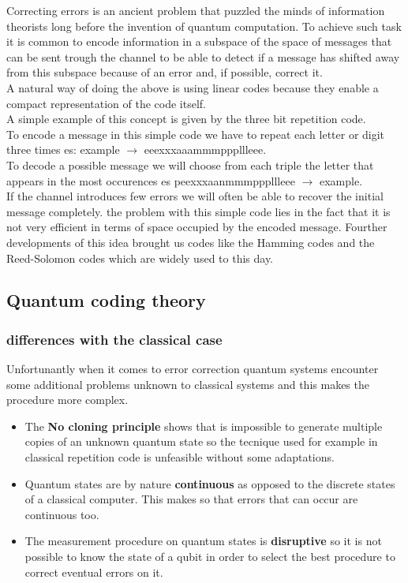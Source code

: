 \documentclass{article}
\begin{document}
Correcting errors is an ancient problem that puzzled the minds of
information theorists long before the invention of quantum computation.
To achieve such task it is common to encode information in a subspace of
the space of messages that can be sent trough the channel to be able to
detect if a message has shifted away from this subspace because of an
error and, if possible, correct it.\\
A natural way of doing the above is using linear codes because they
enable a compact representation of the code itself.\\
A simple example of this concept is given by the three bit repetition
code.\\
To encode a message in this simple code we have to repeat each letter
or digit three times es: example $\rightarrow$ eeexxxaaammmpppllleee.\\
To decode a possible message we will choose from each triple the
letter that appears in the most occurences es peexxxaanmmmpppllleee $\rightarrow$ example. \\
If the channel introduces few errors we will often be able to recover
the initial message completely.
the problem with this simple code lies in the fact that it is not very
efficient in terms of space occupied by the encoded message.
Fourther developments of this idea brought us codes like the Hamming
codes and the Reed-Solomon codes which are widely used to this day.


\subsection{Quantum coding theory}

\subsubsection{differences with the classical case}

Unfortunantly when it comes to error correction quantum systems encounter
some additional problems unknown to classical systems and this makes the
procedure more complex.
\begin {itemize}

\item The \textbf{No cloning principle} shows that is impossible to generate
multiple copies of an unknown quantum state so the tecnique used for example
in classical repetition code is unfeasible without some adaptations.

\item Quantum states are by nature \textbf{continuous} as opposed to the
discrete states of a classical computer.
This makes so that errors that can occur are continuous too.

\item The measurement procedure on quantum states is \textbf{disruptive} so it is not
possible to know the state of a qubit in order to select the best procedure
to correct eventual errors on it.
\end{itemize}
\end{document}
